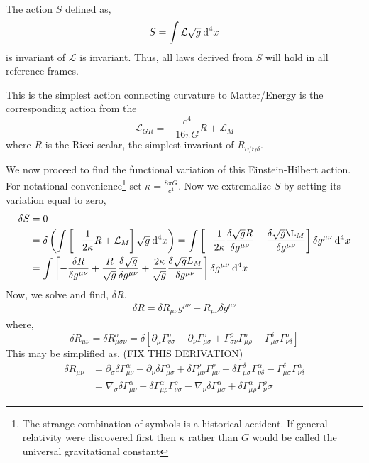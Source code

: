 \documentclass[11pt, a4paper]{article}
\begin{document}
\\
The action $S$ defined as, 
\[S = \int \mathcal{L}\sqrt{g} \: \mathrm{d}^{4} x \]
is invariant of $\mathcal{L}$ is invariant.  Thus, all laws derived from $S$ will hold in all reference frames.
\begin{definition}
This is the simplest action connecting curvature to Matter/Energy is the corresponding action from the
\[\mathcal{L}_{GR}  =-\frac{c^4}{16 \pi G} R + \mathcal{L}_M\]
where $R$ is the Ricci scalar, the simplest invariant of $R_{\alpha\beta\gamma\delta}$.  
\end{definition}
We now proceed to find the functional variation of this Einstein-Hilbert action. For notational convenience\footnote{The strange combination of symbols is a historical accident. If general relativity were discovered first then $\kappa$ rather than $G$ would be called the universal gravitational constant} set $\kappa = \frac{8\pi G}{c^4}$. Now we extremalize $S$ by setting its variation equal to zero, 
\begin{align*}
\delta S & = 0
\\
& = \delta\left(\int \left[ -\frac{1}{2\kappa} R + \mathcal{L}_M\right]\sqrt{g} \: \dn{4}{x} \right)
= 
\int \left[-\frac{1}{2\kappa}\frac{\delta \sqrt{g} R}{\delta g^{\mu\nu}} +\frac{\delta\sqrt{g}\L_M}{\delta g^{\mu\nu}}\right] \delta g^{\mu\nu} \: \dn{4}{x}
\\
& = \int \left[ -\frac{\delta R}{\delta g^{\mu\nu}} + \frac{R}{\sqrt{g}}\frac{\delta\sqrt{g}}{\delta g^{\mu\nu}} + \frac{2\kappa}{\sqrt{g}} \frac{\delta\sqrt{g}L_M}{\delta g^{\mu\nu}}\right] \delta g^{\mu\nu} \: \dn{4}{x}
\end{align*}
Now, we solve and find, $\delta R$.  
\begin{align*}
    \delta R = \delta R_{\mu\nu} g^{\mu\nu}+ R_{\mu\nu} \delta g^{\mu\nu}
\end{align*}
where, 
\[\delta R_{\mu\nu} = \delta R^\sigma_{\mu\sigma \nu} = \delta\left[\partial_\mu \Gamma^\sigma _{v\sigma} -\partial_\nu \Gamma^\sigma_{\mu\sigma} + \Gamma^\rho_{\sigma \nu}\Gamma^\sigma_{\mu \rho} -\Gamma^\delta _{\mu\sigma} \Gamma^\sigma_{\nu \delta} \right] \]
This may be simplified as, 
{\color{red} (FIX THIS DERIVATION)}
\begin{align*}
\delta R_{\mu\nu}& = \partial_\sigma \delta \Gamma^\alpha_{\mu\nu} - \partial_\nu \delta \Gamma^\alpha_{\mu\sigma} + \delta \Gamma^\rho_{\mu\nu} \Gamma^\rho_{\mu\nu} -\delta \Gamma^\delta _{\mu\sigma} \Gamma^\alpha_{\nu\delta} - \Gamma^\delta _{\mu\sigma} \Gamma^\alpha_{\nu\delta}
\\
& = \nabla_\sigma \delta\Gamma^\alpha_{\mu\nu} + \delta \Gamma^\alpha_{\mu\rho} \Gamma^\rho_{\nu\sigma} - \nabla_\nu \delta\Gamma^\alpha_{\mu\sigma} + \delta \Gamma^\alpha_{\mu\rho} \Gamma^\rho _\nu\sigma
\end{align*}
\end{document}
